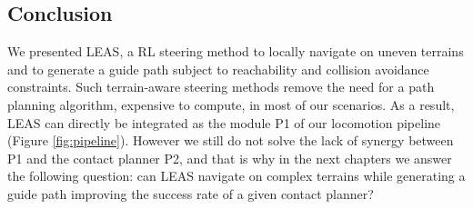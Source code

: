 \subsection{Conclusion}
We presented LEAS, a RL steering method to locally navigate on uneven terrains and to generate a guide path subject to reachability and collision avoidance constraints. 
Such terrain-aware steering methods remove the need for a path planning algorithm, expensive to compute, in most of our scenarios.
As a result, LEAS can directly be integrated as the module P1 of our locomotion pipeline (Figure \ref{fig:pipeline}).
However we still do not solve the lack of synergy between P1 and the contact planner P2, and that is why in the next chapters we answer the following question: can LEAS navigate on complex terrains while generating a guide path improving the success rate of a given contact planner?

